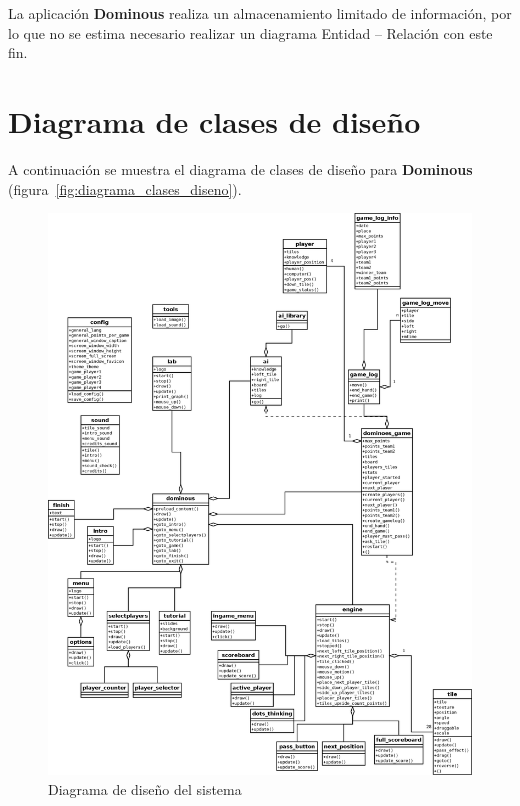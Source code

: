 La aplicación \textbf{Dominous} realiza un almacenamiento limitado de información, por lo que no se estima necesario
realizar un diagrama Entidad -- Relación con este fin.

\section{Diagrama de clases de diseño}

A continuación se muestra el diagrama de clases de diseño para \textbf{Dominous} (figura~\vref{fig:diagrama_clases_diseno}).

\begin{figure}[hp]
  \begin{center}
    \includegraphics[width=1\textwidth]{diagrama_clases_diseno.png}
  \end{center}
  \caption{Diagrama de diseño del sistema}
  \label{fig:diagrama_clases_diseno}
\end{figure}


